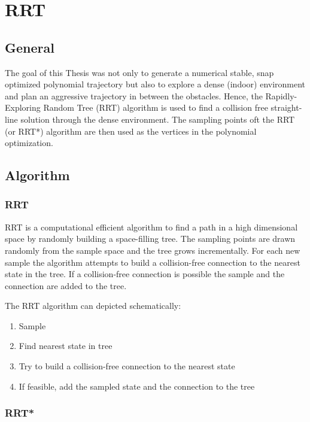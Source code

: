\chapter{RRT}\label{chap:RRT}

\section{General}

The goal of this Thesis was not only to generate a numerical stable, snap optimized polynomial trajectory but also to explore a dense (indoor) environment and plan an aggressive trajectory in between the obstacles. Hence, the Rapidly-Exploring Random Tree (RRT) algorithm is used to find a collision free straight-line solution through the dense environment. The sampling points oft the RRT (or RRT*) algorithm are then used as the vertices in the polynomial optimization.

\section{Algorithm}

\subsection{RRT}

RRT is a computational efficient algorithm to find a path in a high dimensional space by randomly building a space-filling tree. The sampling points are drawn randomly from the sample space and the tree grows incrementally. 
For each new sample the algorithm attempts to build a collision-free connection to the nearest state in the tree. If a collision-free connection is possible the sample and the connection are added to the tree. \newline

The RRT algorithm can depicted schematically:


\begin{enumerate}
  \item Sample
  \item Find nearest state in tree
  \item Try to build a collision-free connection to the nearest state
  \item If feasible, add the sampled state and the connection to the tree
\end{enumerate}

\subsection{RRT*}

